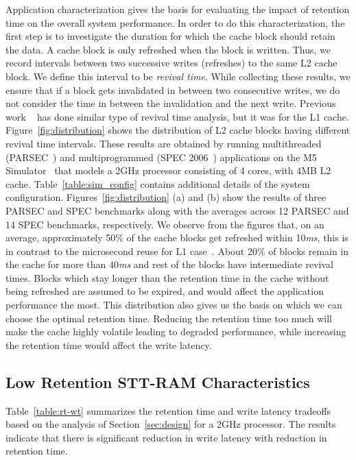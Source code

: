Application characterization gives the basis for evaluating the impact of retention time on the overall system performance. In order to do this characterization, the first step is to investigate the duration for which the cache block should retain the data.  A cache block is only refreshed when the block is written. Thus, we record intervals between two successive writes (refreshes) to the same L2 cache block. We define this interval to be {\it revival time}.
While collecting these results, we ensure that if a block gets invalidated in between two consecutive writes,
we do not consider the time in between the invalidation and the next write.
Previous work ~\cite{3t1d-cache} has done similar type of revival time analysis, but it was for the L1 cache. Figure~\ref{fig:distribution} shows the distribution of L2 cache blocks having different revival time intervals. These results are obtained by running multithreaded (PARSEC~\cite{PARSEC}) and multiprogrammed (SPEC 2006~\cite{SPEC}) applications on the M5 Simulator~\cite{M5} that models a 2GHz processor consisting of 4 cores, with 4MB L2 cache. Table~\ref{table:sim_config} contains additional details of the system configuration.
Figures~\ref{fig:distribution} (a) and (b) show the results of three PARSEC and SPEC benchmarks along with the averages
across 12 PARSEC  and 14 SPEC benchmarks, respectively. We observe from the figures that, on an average,
approximately 50\% of the cache blocks get refreshed within 10{\it ms}, this is in contrast to the microsecond
reuse for L1 case~\cite{3t1d-cache}. About 20\% of blocks remain in the cache for more than 40{\it ms} and rest of the blocks
have intermediate revival times. Blocks which stay longer than the retention time in the cache without being refreshed
are assumed to be expired, and would affect the application performance the most.
This distribution also gives us the basis on which we can choose the optimal retention time.
Reducing the retention time too much will make the cache highly volatile leading to degraded performance,
while increasing the retention time would affect the write latency.



\subsection{Low Retention STT-RAM Characteristics}
Table~\ref{table:rt-wt} summarizes the retention time and write latency tradeoffs based on the analysis of Section~\ref{sec:design}
for a 2GHz processor.
The results indicate that there is significant reduction in write latency with reduction in retention time.

